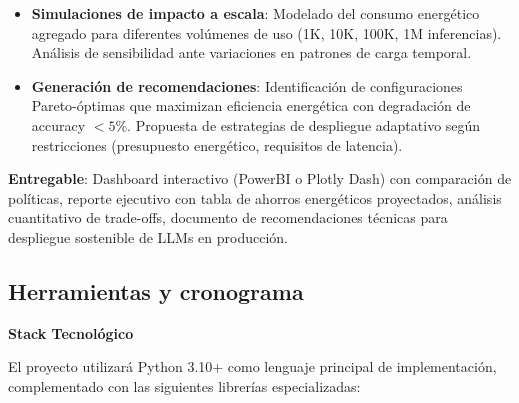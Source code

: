 \begin{itemize}
    \item \textbf{Simulaciones de impacto a escala}: Modelado del consumo energético agregado para diferentes volúmenes de uso (1K, 10K, 100K, 1M inferencias). Análisis de sensibilidad ante variaciones en patrones de carga temporal.
    
    \item \textbf{Generación de recomendaciones}: Identificación de configuraciones Pareto-óptimas que maximizan eficiencia energética con degradación de accuracy $< 5\%$. Propuesta de estrategias de despliegue adaptativo según restricciones (presupuesto energético, requisitos de latencia).
\end{itemize}

\textbf{Entregable}: Dashboard interactivo (PowerBI o Plotly Dash) con comparación de políticas, reporte ejecutivo con tabla de ahorros energéticos proyectados, análisis cuantitativo de trade-offs, documento de recomendaciones técnicas para despliegue sostenible de LLMs en producción.

\subsection{Herramientas y cronograma}

\textbf{Stack Tecnológico}

El proyecto utilizará Python 3.10+ como lenguaje principal de implementación, complementado con las siguientes librerías especializadas:

